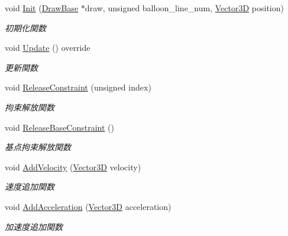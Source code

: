 \begin{DoxyCompactItemize}
void \mbox{\hyperlink{class_balloon_aa108fd9e0a2b09c9b729a49d6c170c05}{Init}} (\mbox{\hyperlink{class_draw_base}{Draw\+Base}} $\ast$draw, unsigned balloon\+\_\+line\+\_\+num, \mbox{\hyperlink{class_vector3_d}{Vector3D}} position)
\begin{DoxyCompactList}\small\item\em 初期化関数 \end{DoxyCompactList}\item 
void \mbox{\hyperlink{class_balloon_ac924b8fb0e2ba4a2a3bae0b7fed6ad13}{Update}} () override
\begin{DoxyCompactList}\small\item\em 更新関数 \end{DoxyCompactList}\item 
void \mbox{\hyperlink{class_balloon_ab7ec0e99baf0b4184b398e98a41d9f48}{Release\+Constraint}} (unsigned index)
\begin{DoxyCompactList}\small\item\em 拘束解放関数 \end{DoxyCompactList}\item 
void \mbox{\hyperlink{class_balloon_a01a2400bc5bbe5a58e8605c1a21af2d5}{Release\+Base\+Constraint}} ()
\begin{DoxyCompactList}\small\item\em 基点拘束解放関数 \end{DoxyCompactList}\item 
void \mbox{\hyperlink{class_balloon_a503ae04cd30e57b0073c829d68f844dd}{Add\+Velocity}} (\mbox{\hyperlink{class_vector3_d}{Vector3D}} velocity)
\begin{DoxyCompactList}\small\item\em 速度追加関数 \end{DoxyCompactList}\item 
void \mbox{\hyperlink{class_balloon_ab29a0490f62947c1cd0e61efb9dc1c1c}{Add\+Acceleration}} (\mbox{\hyperlink{class_vector3_d}{Vector3D}} acceleration)
\begin{DoxyCompactList}\small\item\em 加速度追加関数 \end{DoxyCompactList}\end{DoxyCompactItemize}
